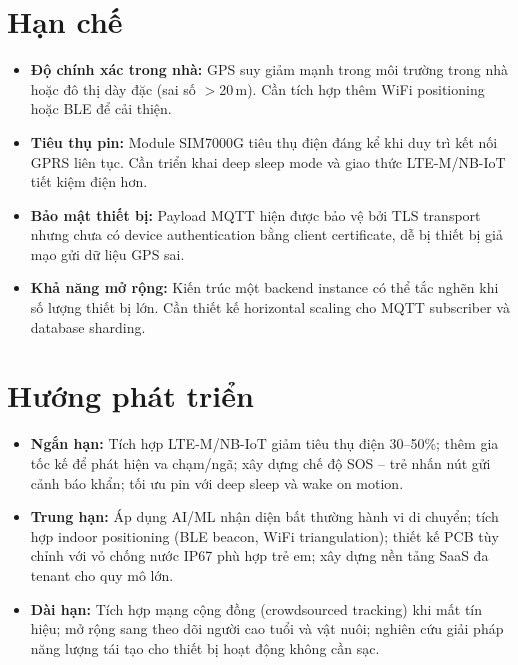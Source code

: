 \documentclass[../DoAn.tex]{subfiles}
\begin{document}
\section{Hạn chế}

\begin{itemize}
  \item \textbf{Độ chính xác trong nhà:} GPS suy giảm mạnh trong môi trường trong nhà hoặc đô thị dày đặc (sai số $>$20\,m). Cần tích hợp thêm WiFi positioning hoặc BLE để cải thiện.

  \item \textbf{Tiêu thụ pin:} Module SIM7000G tiêu thụ điện đáng kể khi duy trì kết nối GPRS liên tục. Cần triển khai deep sleep mode và giao thức LTE-M/NB-IoT tiết kiệm điện hơn.

  \item \textbf{Bảo mật thiết bị:} Payload MQTT hiện được bảo vệ bởi TLS transport nhưng chưa có device authentication bằng client certificate, dễ bị thiết bị giả mạo gửi dữ liệu GPS sai.

  \item \textbf{Khả năng mở rộng:} Kiến trúc một backend instance có thể tắc nghẽn khi số lượng thiết bị lớn. Cần thiết kế horizontal scaling cho MQTT subscriber và database sharding.
\end{itemize}

\section{Hướng phát triển}

\begin{itemize}
  \item \textbf{Ngắn hạn:} Tích hợp LTE-M/NB-IoT giảm tiêu thụ điện 30--50\%; thêm gia tốc kế để phát hiện va chạm/ngã; xây dựng chế độ SOS -- trẻ nhấn nút gửi cảnh báo khẩn; tối ưu pin với deep sleep và wake on motion.

  \item \textbf{Trung hạn:} Áp dụng AI/ML nhận diện bất thường hành vi di chuyển; tích hợp indoor positioning (BLE beacon, WiFi triangulation); thiết kế PCB tùy chỉnh với vỏ chống nước IP67 phù hợp trẻ em; xây dựng nền tảng SaaS đa tenant cho quy mô lớn.

  \item \textbf{Dài hạn:} Tích hợp mạng cộng đồng (crowdsourced tracking) khi mất tín hiệu; mở rộng sang theo dõi người cao tuổi và vật nuôi; nghiên cứu giải pháp năng lượng tái tạo cho thiết bị hoạt động không cần sạc.
\end{itemize}
\end{document}
